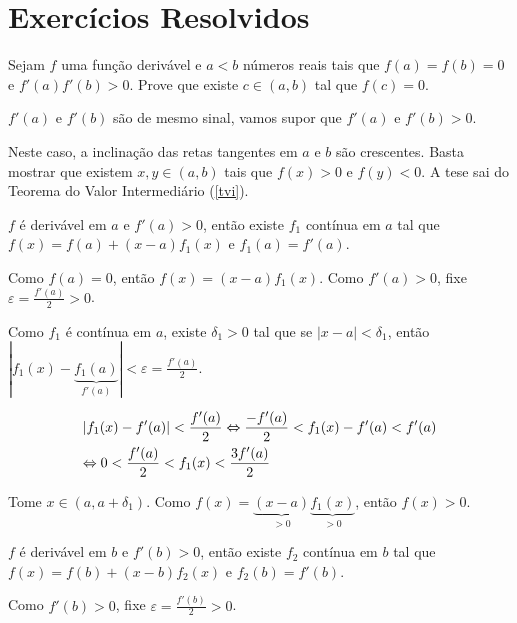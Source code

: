 \documentclass{book}
\begin{document}
\section{Exerc\'icios Resolvidos}

\begin{exerc}
Sejam $f$ uma fun\c c\~ao deriv\'avel e $a < b$ n\'umeros reais tais que $f(a) = f(b) = 0$ e $f'(a)f'(b) > 0$. Prove que existe $c \in (a,b)$ tal que $f(c) = 0$.
\end{exerc}

\begin{sol}
$f'(a)$ e $f'(b)$ s\~ao de mesmo sinal, vamos supor que $f'(a)$ e $f'(b) > 0$.


Neste caso, a inclina\c c\~ao das retas tangentes em $a$ e $b$ s\~ao crescentes. Basta mostrar que existem $x,y \in (a,b)$ tais que $f(x) > 0$ e $f(y) < 0$. A tese sai do Teorema do Valor Intermedi\'ario (\ref{tvi}).

\begin{sloppypar}
$f$ \'e deriv\'avel em $a$ e $f'(a) > 0$, ent\~ao existe $f_1$ cont\'inua em $a$ tal que ${f(x) = f(a) + (x - a)f_1(x)}$ e $f_1(a) = f'(a)$.
\end{sloppypar}

Como $f(a) = 0$, ent\~ao $f(x) = (x - a)f_1(x)$. Como $f'(a) > 0$, fixe $\varepsilon = \frac{f'(a)}{2} > 0$.

Como $f_1$ \'e cont\'inua em $a$, existe $\delta_1 > 0$ tal que se $|x - a| < \delta_1$, ent\~ao $\left| {f_1 (x) - \underbrace {f_1 (a)}_{f'(a)}} \right| < \varepsilon  = \frac{{f'(a)}}{2}$.

\[
\begin{gathered}
  |f_1(x) - f'(a)| < \frac{f'(a)}{2} \sse \frac{-f'(a)}{2} < f_1(x) - f'(a) < f'(a) \hfill \\
  \sse 0 < \frac{f'(a)}{2} < f_1(x) < \frac{3f'(a)}{2} \hfill \\ 
\end{gathered} 
\]

Tome $x \in (a,a + \delta_1)$. Como $f(x) = \underbrace{(x - a)}_{>0} \underbrace{f_1(x)}_{>0}$, ent\~ao $f(x) > 0$.

\begin{sloppypar}
$f$ \'e deriv\'avel em $b$ e $f'(b) > 0$, ent\~ao existe $f_2$ cont\'inua em $b$ tal que ${f(x) = f(b) + (x - b)f_2(x)}$ e $f_2(b) = f'(b)$.
\end{sloppypar}

Como $f'(b) > 0$, fixe $\varepsilon = \frac{f'(b)}{2} > 0$.


\end{sol}
\end{document}
